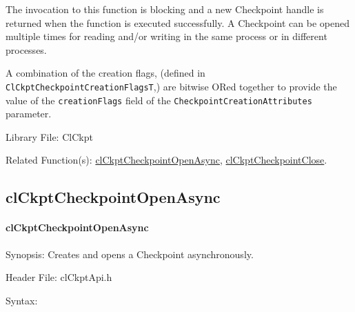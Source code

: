 \begin{flushleft}
\begin{Desc}
The invocation to this function is blocking and a new Checkpoint handle is returned when the function is executed successfully. A Checkpoint can be 
opened multiple times for reading and/or writing in the same process or in different processes.
\par
A combination of the creation flags, (defined in {\tt{ClCkptCheckpointCreationFlagsT}},) are bitwise ORed together to provide the value of 
the {\tt{creationFlags}} field of the {\tt{CheckpointCreationAttributes}} parameter.
\end{Desc}
\begin{Desc}
\item[Library File:]Cl\-Ckpt\end{Desc}
\begin{Desc}
\item[Related Function(s):]\hyperlink{pageckpt104}{cl\-Ckpt\-Checkpoint\-Open\-Async}, \hyperlink{pageckpt105}{cl\-Ckpt\-Checkpoint\-Close}. \end{Desc}
\newpage


\subsection{clCkptCheckpointOpenAsync}
\hypertarget{pageckpt104}{}\paragraph{cl\-Ckpt\-Checkpoint\-Open\-Async}\label{pageckpt104}
\begin{Desc}
\item[Synopsis:]Creates and opens a Checkpoint asynchronously.\end{Desc}
\begin{Desc}
\item[Header File:]clCkptApi.h\end{Desc}
\begin{Desc}
\item[Syntax:]


\end{Desc}
\end{flushleft}
